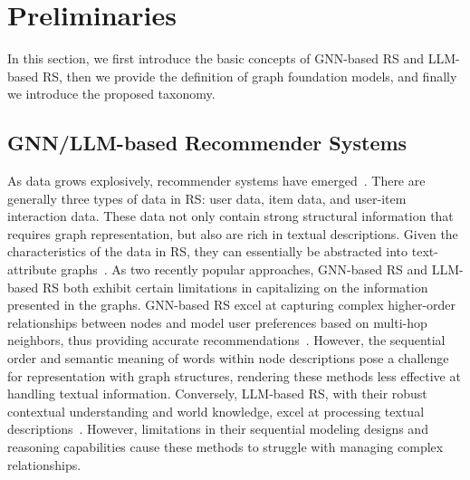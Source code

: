 \section{Preliminaries}
In this section, we first introduce the basic concepts of GNN-based RS and LLM-based RS, then we provide the definition of graph foundation models, and finally we introduce the proposed taxonomy.
% 

\subsection{GNN/LLM-based Recommender Systems}
As data grows explosively, recommender systems have emerged~\cite{gao2023survey}. There are generally three types of data in RS: user data, item data, and user-item interaction data. These data not only contain strong structural information that requires graph representation, but also are rich in textual descriptions. Given the characteristics of the data in RS, they can essentially be abstracted into text-attribute graphs~\cite{jin2024large}.
As two recently popular approaches, GNN-based RS and LLM-based RS both exhibit certain limitations in capitalizing on the information presented in the graphs.
GNN-based RS excel at capturing complex higher-order relationships between nodes and model user preferences based on multi-hop neighbors, thus providing accurate recommendations~\cite{wu2020comprehensive,wang2021graph}. However, the sequential order and semantic meaning of words within node descriptions pose a challenge for representation with graph structures, rendering these methods less effective at handling textual information.
Conversely, LLM-based RS, with their robust contextual understanding and world knowledge, excel at processing textual descriptions~\cite{yang2023palr,zhai2024actions}. However, limitations in their sequential modeling designs and reasoning capabilities cause these methods to struggle with managing complex relationships.
